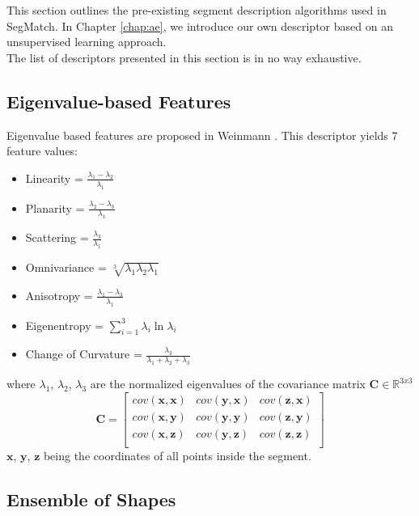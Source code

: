 This section outlines the pre-existing segment description algorithms used in SegMatch. In Chapter \ref{chap:ae}, we introduce our own descriptor based on an unsupervised learning approach.\\

The list of descriptors presented in this section is in no way exhaustive.\\

\subsection{Eigenvalue-based Features}
\label{subsec:eigenvalues}

Eigenvalue based features are proposed in Weinmann \cite{weinmann2014semantic}. This descriptor yields 7 feature values:

\begin{itemize}
  \item{Linearity = $\frac{\lambda_1 - \lambda_2}{\lambda_1}$}
  \item{Planarity = $\frac{\lambda_2 - \lambda_3}{\lambda_1}$}
  \item{Scattering = $\frac{\lambda_3}{\lambda_1}$}
  \item{Omnivariance = $\sqrt[3]{\lambda_1 \lambda_2 \lambda_1}$}
  \item{Anisotropy = $\frac{\lambda_1 - \lambda_3}{\lambda_1}$}
  \item{Eigenentropy = $\sum\limits_{i=1}^3 \lambda_i \ln{\lambda_i}$}
  \item{Change of Curvature = $\frac{\lambda_3}{\lambda_1 + \lambda_2 + \lambda_3}$}
\end{itemize}

where $\lambda_1$, $\lambda_2$, $\lambda_3$ are the normalized eigenvalues of the covariance matrix $\mathbf{C} \in \mathbb{R}^{3x3}$
$$
\mathbf{C} = 
\begin{bmatrix}
  cov(\textbf{x},\textbf{x}) & cov(\textbf{y},\textbf{x}) & cov(\textbf{z},\textbf{x})  \\
  cov(\textbf{x},\textbf{y}) & cov(\textbf{y},\textbf{y}) & cov(\textbf{z},\textbf{y})  \\
  cov(\textbf{x},\textbf{z}) & cov(\textbf{y},\textbf{z}) & cov(\textbf{z},\textbf{z})  \\
\end{bmatrix} 
$$
$\textbf{x}$, $\textbf{y}$, $\textbf{z}$ being the coordinates of all points inside the segment.

\subsection{Ensemble of Shapes}
\label{subsec:ensemble-of-shapes}

